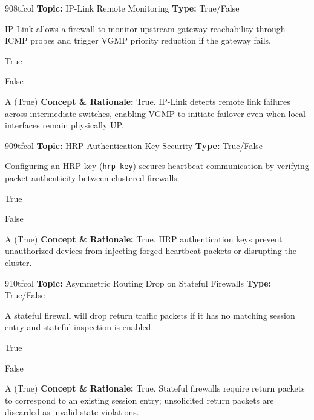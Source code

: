 \begin{qcard}{908}{tfcol}
\textcolor{darkslate!75}{\small\textbf{Topic:} IP-Link Remote Monitoring \hfill \textbf{Type:} True/False}\vspace{0.4em}\par
IP-Link allows a firewall to monitor upstream gateway reachability through ICMP probes and trigger VGMP priority reduction if the gateway fails.
\begin{qoptions}
\item True
\item False
\end{qoptions}
\end{qcard}
\nopagebreak
\begin{explainbox}{A (True)}
\textbf{Concept \& Rationale:} True. IP-Link detects remote link failures across intermediate switches, enabling VGMP to initiate failover even when local interfaces remain physically UP.
\end{explainbox}

\begin{qcard}{909}{tfcol}
\textcolor{darkslate!75}{\small\textbf{Topic:} HRP Authentication Key Security \hfill \textbf{Type:} True/False}\vspace{0.4em}\par
Configuring an HRP key (\texttt{hrp key}) secures heartbeat communication by verifying packet authenticity between clustered firewalls.
\begin{qoptions}
\item True
\item False
\end{qoptions}
\end{qcard}
\nopagebreak
\begin{explainbox}{A (True)}
\textbf{Concept \& Rationale:} True. HRP authentication keys prevent unauthorized devices from injecting forged heartbeat packets or disrupting the cluster.
\end{explainbox}

\begin{qcard}{910}{tfcol}
\textcolor{darkslate!75}{\small\textbf{Topic:} Asymmetric Routing Drop on Stateful Firewalls \hfill \textbf{Type:} True/False}\vspace{0.4em}\par
A stateful firewall will drop return traffic packets if it has no matching session entry and stateful inspection is enabled.
\begin{qoptions}
\item True
\item False
\end{qoptions}
\end{qcard}
\nopagebreak
\begin{explainbox}{A (True)}
\textbf{Concept \& Rationale:} True. Stateful firewalls require return packets to correspond to an existing session entry; unsolicited return packets are discarded as invalid state violations.
\end{explainbox}

